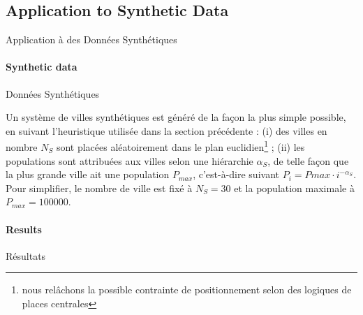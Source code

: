 \subsection{Application to Synthetic Data}{Application à des Données Synthétiques}




\paragraph{Synthetic data}{Données Synthétiques}

Un système de villes synthétiques est généré de la façon la plus simple possible, en suivant l'heuristique utilisée dans la section précédente : (i) des villes en nombre $N_S$ sont placées aléatoirement dans le plan euclidien\footnote{nous relâchons la possible contrainte de positionnement selon des logiques de places centrales} ; (ii) les populations sont attribuées aux villes selon une hiérarchie $\alpha_S$, de telle façon que la plus grande ville ait une population $P_{max}$, c'est-à-dire suivant $P_i = P{max} \cdot i^{-\alpha_S}$. Pour simplifier, le nombre de ville est fixé à $N_S = 30$ et la population maximale à $P_{max} = 100000$.


\paragraph{Results}{Résultats}


